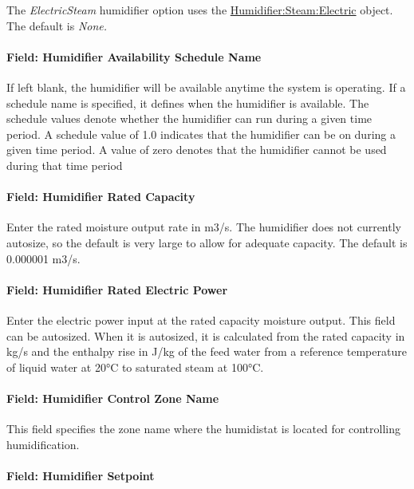 The \emph{ElectricSteam} humidifier option uses the \hyperref[humidifiersteamelectric]{Humidifier:Steam:Electric} object. The default is \emph{None.}

\paragraph{Field: Humidifier Availability Schedule Name}\label{field-humidifier-availability-schedule-name-4}

If left blank, the humidifier will be available anytime the system is operating. If a schedule name is specified, it defines when the humidifier is available. The schedule values denote whether the humidifier can run during a given time period. A schedule value of 1.0 indicates that the humidifier can be on during a given time period. A value of zero denotes that the humidifier cannot be used during that time period

\paragraph{Field: Humidifier Rated Capacity}\label{field-humidifier-rated-capacity-4}

Enter the rated moisture output rate in m3/s. The humidifier does not currently autosize, so the default is very large to allow for adequate capacity. The default is 0.000001 m3/s.

\paragraph{Field: Humidifier Rated Electric Power}\label{field-humidifier-rated-electric-power-4}

Enter the electric power input at the rated capacity moisture output. This field can be autosized. When it is autosized, it is calculated from the rated capacity in kg/s and the enthalpy rise in J/kg of the feed water from a reference temperature of liquid water at 20°C to saturated steam at 100°C.

\paragraph{Field: Humidifier Control Zone Name}\label{field-humidifier-control-zone-name-4}

This field specifies the zone name where the humidistat is located for controlling humidification.

\paragraph{Field: Humidifier Setpoint}\label{field-humidifier-setpoint-3}

